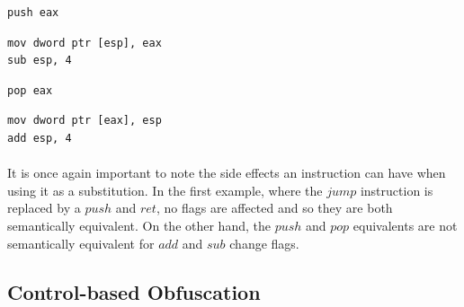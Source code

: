 \noindent\begin{minipage}{.45\textwidth}
	\begin{lstlisting}[caption={Program equivalent to the one in Listing~\ref{lst:push_mov_sub_2}. Semantic equivalence preserved.}, label={lst:push_mov_sub_1}, frame=tlrb, language={[x86masm]Assembler}, otherkeywords={.CODE}]
push eax
	\end{lstlisting}
\end{minipage}\hfill
\begin{minipage}{.45\textwidth}
	\begin{lstlisting}[caption={Program equivalent to the one in Listing~\ref{lst:push_mov_sub_1}. Semantic equivalence preserved.}, label={lst:push_mov_sub_2}, frame=tlrb, language={[x86masm]Assembler}]
mov dword ptr [esp], eax
sub esp, 4
	\end{lstlisting}
\end{minipage}

\noindent\begin{minipage}{.45\textwidth}
	\begin{lstlisting}[caption={Program equivalent to the one in Listing~\ref{lst:pop_mov_add_2}. Semantic equivalence preserved.}, label={lst:pop_mov_add_1}, frame=tlrb, language={[x86masm]Assembler}, otherkeywords={.CODE}]
pop eax
	\end{lstlisting}
\end{minipage}\hfill
\begin{minipage}{.45\textwidth}
	\begin{lstlisting}[caption={Program equivalent to the one in Listing~\ref{lst:pop_mov_add_1}. Semantic equivalence preserved.}, label={lst:pop_mov_add_2}, frame=tlrb, language={[x86masm]Assembler}]
mov dword ptr [eax], esp
add esp, 4
	\end{lstlisting}
\end{minipage}

\paragraph{}
It is once again important to note the side effects an instruction can have when using it as a substitution. In the first example, where the $jump$ instruction is replaced by a $push$ and $ret$, no flags are affected and so they are both semantically equivalent. On the other hand, the $push$ and $pop$ equivalents are not semantically equivalent for $add$ and $sub$ change flags.

\subsection{Control-based Obfuscation}

